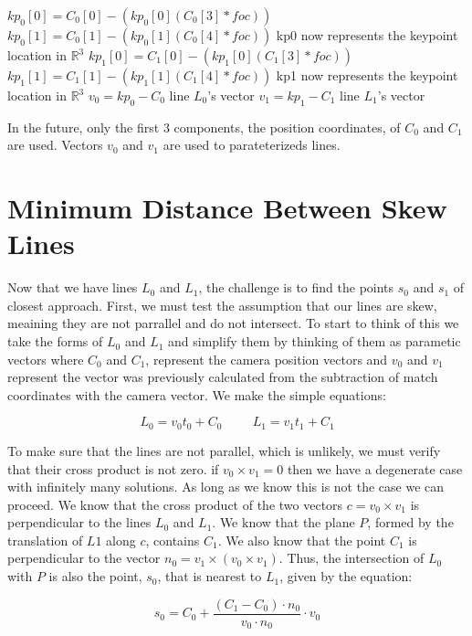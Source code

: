 \begin{algorithm}
\begin{algorithmic}[1]
    \State $kp_0[0] = C_0[0] - (kp_0[0] (C_0[3] * foc))$
    \State $kp_0[1] = C_0[1] - (kp_0[1] (C_0[4] * foc))$
    \Comment kp0 now represents the keypoint location in $\mathbb{R}^{3}$
    \State $kp_1[0] = C_1[0] - (kp_1[0] (C_1[3] * foc))$
    \State $kp_1[1] = C_1[1] - (kp_1[1] (C_1[4] * foc))$
    \Comment kp1 now represents the keypoint location in $\mathbb{R}^{3}$
    \State $v_0 = kp_0 - C_0$
    \Comment line $L_0$'s vector
    \State $v_1 = kp_1 - C_1$
    \Comment line $L_1$'s vector
  \EndProcedure
\end{algorithmic}
\end{algorithm}

In the future, only the first $3$ components, the position coordinates, of $C_0$ and $C_1$ are used.
Vectors $v_0$ and $v_1$ are used to parateterizeds lines.

\newpage
\section{Minimum Distance Between Skew Lines}
Now that we have lines $L_0$ and $L_1$, the challenge is to find the points $s_0$ and $s_1$ of
closest approach. First, we must test the assumption that our lines are skew, meaining they
are not parrallel and do not intersect. To start to think of this we take the forms of $L_0$ and $L_1$
and simplify them by thinking of them as parametic vectors where $C_0$ and $C_1$, represent the camera
position vectors and $v_0$ and $v_1$ represent the vector was previously calculated from the subtraction
of match coordinates with the camera vector. We make the simple equations:

\[
L_0 = v_0 t_0 + C_0 \hspace{1cm} L_1 = v_1 t_1 + C_1
\]

To make sure that the lines are not parallel, which is unlikely, we must verify that their cross product
is not zero. if $v_0 \times v_1 = 0$ then we have a degenerate case with infinitely many solutions. As long
as we know this is not the case we can proceed. We know that the cross product of the two vectors
$c = v_0 \times v_1$ is perpendicular to the lines $L_0$ and $L_1$. We know that the plane $P$, formed by the
translation of $L1$ along $c$, contains $C_1$. We also know
that the point $C_1$ is perpendicular to the vector $n_0 = v_1 \times (v_0 \times v_1)$. Thus, the intersection
of $L_0$ with $P$ is also the point, $s_0$, that is nearest to $L_1$, given by the equation:

\[
s_0 = C_0 + \frac{(C_1 - C_0) \cdot n_0}{v_0 \cdot n_0} \cdot v_0
\]

